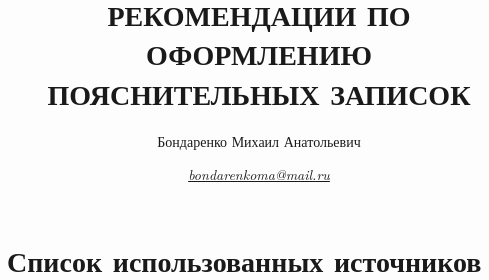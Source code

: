 \documentclass[a4paper,14pt,final]{extarticle}
\begin{document}






% 
%


\title{РЕКОМЕНДАЦИИ ПО ОФОРМЛЕНИЮ ПОЯСНИТЕЛЬНЫХ ЗАПИСОК}

\author{Бондаренко Михаил Анатольевич}
\date{\it \href{mailto:bondarenkoma@mail.ru}{bondarenkoma@mail.ru}}
\maketitle
{} %
\tableofcontents %





% 

\clearpage

\setcounter{biburllcpenalty}{7000}
\setcounter{biburlucpenalty}{8000}

{}
\section*{Список использованных источников}
\printbibliography


%

\clearpage

%
\end{document}
